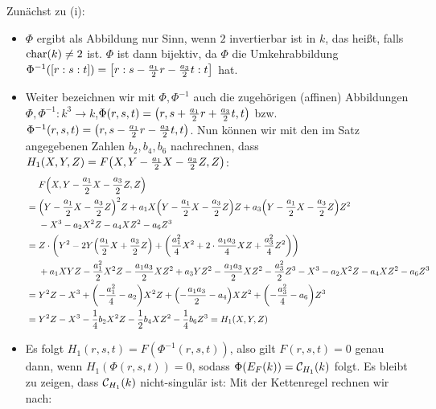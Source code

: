 \begin{bew}
	Zunächst zu (i): \begin{itemize}
		\item $\Phi$ ergibt als Abbildung nur Sinn, wenn $2$ invertierbar ist in $k$, das heißt, falls $\Char(k) \neq 2$ ist. $\Phi$ ist dann bijektiv, da $\Phi$ die Umkehrabbildung $\Phi^{-1}([r:s:t]) = \benbrace*{r : s - \frac{a_1}{2}r - \frac{a_3}{2}t : t}$ hat.
		\item Weiter bezeichnen wir mit $\Phi, \Phi^{-1}$ auch die zugehörigen (affinen) Abbildungen $\Phi, \Phi^{-1}\colon k^3 \longrightarrow k$,\linebreak $\Phi(r,s,t) = \enbrace*{r,s+ \frac{a_1}{2}r + \frac{a_3}{2}t, t}$ bzw. $\Phi^{-1}(r,s,t) = \enbrace*{r,s - \frac{a_1}{2}r - \frac{a_3}{2}t,t}$. 
		Nun können wir mit den im Satz angegebenen Zahlen $b_2,b_4,b_6$ nachrechnen, dass $H_1(X,Y,Z) = F\enbrace*{X,Y - \frac{a_1}{2}X - \frac{a_3}{2}Z,Z}$:
		\begin{equation}
		\begin{aligned}
			& \quad \ F\enbrace*{X,Y-\frac{a_1}{2}X-\frac{a_3}{2}Z,Z} \\
			&= \enbrace*{Y- \frac{a_1}{2} X - \frac{a_3}{2}Z}^2 Z + a_1 X \enbrace*{Y - \frac{a_1}{2} X - \frac{a_3}{2}Z}Z + a_3 \enbrace*{Y - \frac{a_1}{2} X - \frac{a_3}{2} Z}Z^2 \\
			& \quad \ - X^3 - a_2X^2Z - a_4 XZ^2 - a_6Z^3 \\
			&= Z \cdot \enbrace*{Y^2 - 2Y \enbrace*{\frac{a_1}{2}X + \frac{a_3}{2} Z} + \enbrace*{\frac{a_1^2}{4} X^2 + 2 \cdot \frac{a_1 a_3}{4} XZ + \frac{a_3^2}{4} Z^2}} \\
			& \quad \ + a_1XYZ - \frac{a_1^2}{2} X^2 Z - \frac{a_1 a_3}{2} XZ^2 + a_3 YZ^2 - \frac{a_1 a_3}{2} XZ^2 - \frac{a_3^2}{2} Z^3 - X^3 - a_2 X^2 Z - a_4 XZ^2 - a_6Z^3 \\
			&= Y^2 Z - X^3 + \enbrace*{-\frac{a_1^2}{4} - a_2} X^2 Z + \enbrace*{- \frac{a_1 a_3}{2} - a_4} XZ^2 + \enbrace*{- \frac{a_3^2}{4} - a_6} Z^3 \\
			&= Y^2 Z - X^3 - \frac{1}{4} b_2 X^2 Z - \frac{1}{2} b_4 XZ^2 - \frac{1}{4} b_6 Z^3 = H_1(X,Y,Z)
		\end{aligned}
		\end{equation}
		\item Es folgt $H_1(r,s,t) = F(\Phi^{-1}(r,s,t))$, also gilt $F(r,s,t) = 0$ genau dann, wenn $H_1(\Phi(r,s,t))=0$, sodass $\Phi (E_F(k)) = \cc_{H_1}(k)$ folgt. 
		Es bleibt zu zeigen, dass $\cc_{H_1}(k)$ nicht-singulär ist: Mit der Kettenregel rechnen wir nach:

\end{itemize}
\end{bew}

